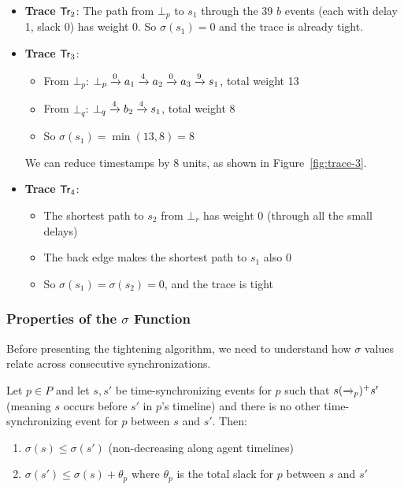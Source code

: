 \begin{itemize}
\item \textbf{Trace $\textsf{Tr}_2$}: The path from $\bot_p$ to $s_1$ through the 39 $b$ events (each with delay 1, slack 0) has weight 0. So $\sigma(s_1) = 0$ and the trace is already tight.

\item \textbf{Trace $\textsf{Tr}_3$}: 
  \begin{itemize}
  \item From $\bot_p$: $\bot_p \xrightarrow{0} a_1 \xrightarrow{4} a_2 \xrightarrow{0} a_3 \xrightarrow{9} s_1$, total weight 13
  \item From $\bot_q$: $\bot_q \xrightarrow{4} b_2 \xrightarrow{4} s_1$, total weight 8
  \item So $\sigma(s_1) = \min(13, 8) = 8$
  \end{itemize}
  We can reduce timestamps by 8 units, as shown in Figure~\ref{fig:trace-3}.

\item \textbf{Trace $\textsf{Tr}_4$}:
  \begin{itemize}
  \item The shortest path to $s_2$ from $\bot_r$ has weight 0 (through all the small delays)
  \item The back edge makes the shortest path to $s_1$ also 0
  \item So $\sigma(s_1) = \sigma(s_2) = 0$, and the trace is tight
  \end{itemize}
\end{itemize}

\subsubsection{Properties of the $\sigma$ Function}

Before presenting the tightening algorithm, we need to understand how $\sigma$ values relate across consecutive synchronizations.

\begin{lemma}\label{lem:sigma-monotone}
Let $p \in P$ and let $s, s'$ be time-synchronizing events for $p$ such that $s (\xrightarrow{}_p)^+ s'$ (meaning $s$ occurs before $s'$ in $p$'s timeline) and there is no other time-synchronizing event for $p$ between $s$ and $s'$. Then:
\begin{enumerate}
\item $\sigma(s) \leq \sigma(s')$ (non-decreasing along agent timelines)
\item $\sigma(s') \leq \sigma(s) + \theta_p$ where $\theta_p$ is the total slack for $p$ between $s$ and $s'$
\end{enumerate}
\end{lemma}

